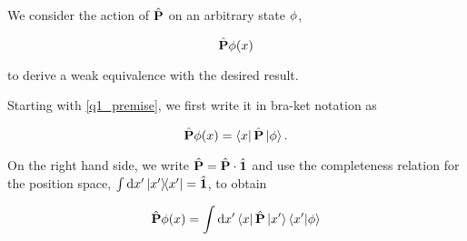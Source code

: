 
We consider the action of $\hat{\textbf{P}}$ on an arbitrary
state $\phi$, 

\begin{equation}
    \hat{\textbf{P}} \phi(x) 
    \label{q1:premise}
\end{equation}

to derive a weak equivalence with the desired result.

Starting with \cref{q1_premise}, we first write it in
bra-ket notation as

\begin{equation}
    \hat{\textbf{P}} \phi(x) = 
        \bra{x} \hat{\textbf{P}} \ket{\phi}.
\end{equation}

On the right hand side, we write $\hat{\textbf{P}} = \hat{\textbf{P}} \cdot \hat{\textbf{1}}$
and use the completeness relation for the position space,
$\int \dd{x'} \ketbra{x'}{x'} = \hat{\textbf{1}}$,
to obtain

\begin{equation}
    \hat{\textbf{P}} \phi(x) = \int \dd{x'} \bra{x} 
                                        \hat{\textbf{P}} \ket{x'}
                                        \braket{x'}{\phi}
\end{equation}

